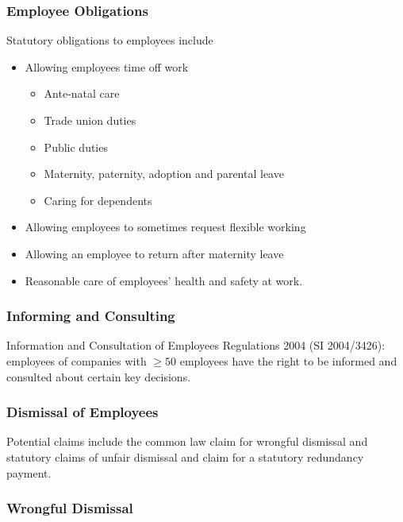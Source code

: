 \documentclass[
]{article}
\providecommand{\tightlist}{%
  \setlength{\itemsep}{0pt}\setlength{\parskip}{0pt}}
\begin{document}
\hypertarget{employee-obligations}{%
\subsubsection{Employee Obligations}\label{employee-obligations}}

Statutory obligations to employees include

\begin{itemize}
\tightlist
\item
  Allowing employees time off work

  \begin{itemize}
  \tightlist
  \item
    Ante-natal care
  \item
    Trade union duties
  \item
    Public duties
  \item
    Maternity, paternity, adoption and parental leave
  \item
    Caring for dependents
  \end{itemize}
\item
  Allowing employees to sometimes request flexible working
\item
  Allowing an employee to return after maternity leave
\item
  Reasonable care of employees' health and safety at work.
\end{itemize}

\hypertarget{informing-and-consulting}{%
\subsubsection{Informing and
Consulting}\label{informing-and-consulting}}

Information and Consultation of Employees Regulations 2004 (SI
2004/3426): employees of companies with {\(\geq 50\)} employees have the
right to be informed and consulted about certain key decisions.

\hypertarget{dismissal-of-employees}{%
\subsubsection{Dismissal of Employees}\label{dismissal-of-employees}}

Potential claims include the common law claim for wrongful dismissal and
statutory claims of unfair dismissal and claim for a statutory
redundancy payment.

\hypertarget{wrongful-dismissal}{%
\subsubsection{Wrongful Dismissal}\label{wrongful-dismissal}}
\end{document}
